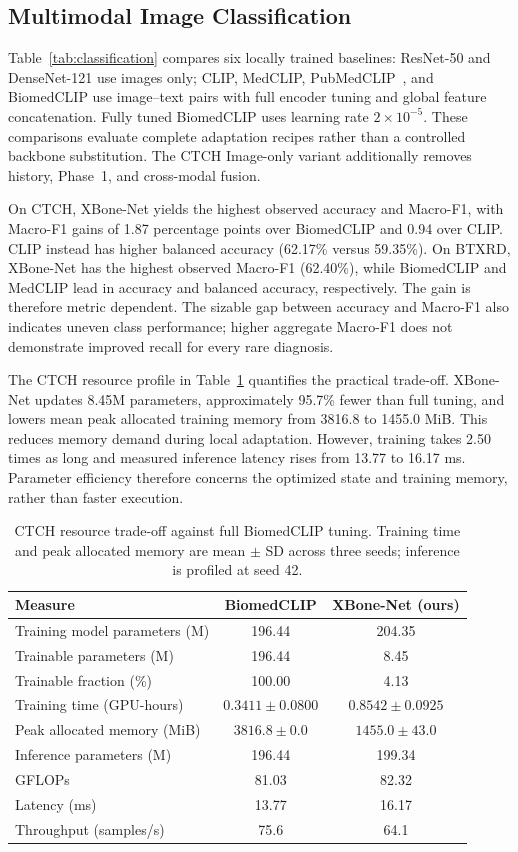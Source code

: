 \documentclass[conference,a4paper]{IEEEtran}
\begin{document}
\subsection{Multimodal Image Classification}
Table~\ref{tab:classification} compares six locally trained baselines: ResNet-50 and DenseNet-121 use images only; CLIP, MedCLIP, PubMedCLIP~\cite{PubMedCLIP}, and BiomedCLIP use image--text pairs with full encoder tuning and global feature concatenation. Fully tuned BiomedCLIP uses learning rate $2\times10^{-5}$. These comparisons evaluate complete adaptation recipes rather than a controlled backbone substitution. The CTCH Image-only variant additionally removes history, Phase~1, and cross-modal fusion.



On CTCH, XBone-Net yields the highest observed accuracy and Macro-F1, with Macro-F1 gains of 1.87 percentage points over BiomedCLIP and 0.94 over CLIP. CLIP instead has higher balanced accuracy (62.17\% versus 59.35\%). On BTXRD, XBone-Net has the highest observed Macro-F1 (62.40\%), while BiomedCLIP and MedCLIP lead in accuracy and balanced accuracy, respectively. The gain is therefore metric dependent. The sizable gap between accuracy and Macro-F1 also indicates uneven class performance; higher aggregate Macro-F1 does not demonstrate improved recall for every rare diagnosis.

The CTCH resource profile in Table~\ref{tab:cost} quantifies the practical trade-off. XBone-Net updates 8.45M parameters, approximately 95.7\% fewer than full tuning, and lowers mean peak allocated training memory from 3816.8 to 1455.0 MiB. This reduces memory demand during local adaptation. However, training takes 2.50 times as long and measured inference latency rises from 13.77 to 16.17 ms. Parameter efficiency therefore concerns the optimized state and training memory, rather than faster execution.

\begin{table}[t]
\caption{CTCH resource trade-off against full BiomedCLIP tuning. Training time and peak allocated memory are mean $\pm$ SD across three seeds; inference is profiled at seed 42.}
\label{tab:cost}
\centering\footnotesize
\begin{tabular}{@{}lcc@{}}
\toprule
Measure & BiomedCLIP & \textbf{XBone-Net (ours)} \\
\midrule
Training model parameters (M) & 196.44 & 204.35 \\
Trainable parameters (M) & 196.44 & 8.45 \\
Trainable fraction (\%) & 100.00 & 4.13 \\
Training time (GPU-hours) & $0.3411\pm0.0800$ & $0.8542\pm0.0925$ \\
Peak allocated memory (MiB) & $3816.8\pm0.0$ & $1455.0\pm43.0$ \\
\midrule
Inference parameters (M) & 196.44 & 199.34 \\
GFLOPs & 81.03 & 82.32 \\
Latency (ms) & 13.77 & 16.17 \\
Throughput (samples/s) & 75.6 & 64.1 \\
\bottomrule
\end{tabular}
\end{table}
\end{document}
